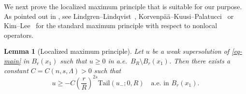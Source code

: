 \documentclass[11pt]{amsart}
\theoremstyle{plain}
\newtheorem{lemma}[theorem]{Lemma}
\theoremstyle{definition}
\numberwithin{equation}{section}
\begin{document}
We next prove the localized maximum principle that is suitable for our purpose. As pointed out in \cite{KL25}, see Lindgren--Lindqvist~\cite[Lemma~9]{LL14}, Korvenp\"a\"a--Kuusi--Palatucci~\cite[Lemma~6]{KKP17} or Kim--Lee~\cite[Lemma~5.2]{KL23} for the standard maximum principle with respect to nonlocal operators.

\begin{lemma}[Localized maximum principle]\label{thm-loc-max-Om}
Let $u$ be a weak supersolution of \eqref{eq-main} in $B_r(x_1)$ such that $u \geq 0$ in a.e.\ $B_{R} \setminus B_{r}(x_1)$. Then there exists a constant $C=C(n,s, \Lambda)>0$ such that 
\begin{equation*}
u \geq -C\left(\frac{r}{R}\right)^{2s}\mathrm{Tail}(u_-; 0, R) \quad \text{a.e.\ in $B_r(x_1)$}.
\end{equation*}
\end{lemma}
\end{document}
